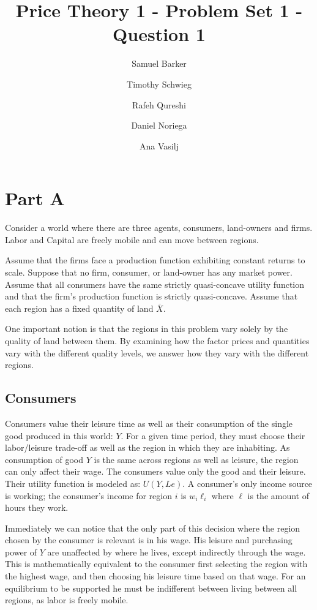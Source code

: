 \documentclass[12pt]{paper}
\title{Price Theory 1 - Problem Set 1 - Question 1}
\author{Samuel Barker \and
  Timothy Schwieg \and
  Rafeh Qureshi \and
  Daniel Noriega \and
Ana Vasilj}
\begin{document}
\maketitle

\section*{Part A}

Consider a world where there are three agents, consumers, land-owners
and firms. Labor and Capital are freely mobile and can move between regions.

Assume that the firms face a production function exhibiting constant
returns to scale. Suppose that no firm, consumer, or land-owner has any
market power. Assume that all consumers have the same strictly quasi-concave
utility function and that the firm's production function is strictly
quasi-concave. Assume that each region has a fixed quantity of land
$\overline{X}$. 

One important notion is that the regions in this problem vary solely
by the quality of land between them. By examining how the factor
prices and quantities vary with the different quality levels, we
answer how they vary with the different regions.

\subsection*{Consumers}

Consumers value their leisure time as well as their consumption of the
single good produced in this world: $Y$. For a given time period, they
must choose their labor/leisure trade-off as well as the region in
which they are inhabiting. As consumption of good $Y$ is the same
across regions as well as leisure, the region can only affect their
wage. The consumers value only the good and their leisure. Their
utility function is modeled as: $U( Y, Le)$. A consumer's only income
source is working; the consumer's income for region $i$ is $w_i \ell_i$
where $\ell$ is the amount of hours they work.

Immediately we can notice that the only part of this decision where
the region chosen by the consumer is relevant is in his wage. His
leisure and purchasing power of $Y$ are unaffected by where he lives,
except indirectly through the wage. This is mathematically equivalent
to the consumer first selecting the region with the highest wage, and
then choosing his leisure time based on that wage. For an equilibrium
to be supported he must be indifferent between living between all
regions, as labor is freely mobile.
\end{document}
